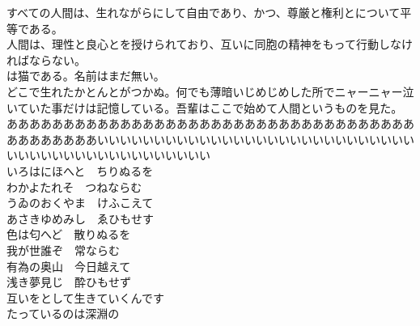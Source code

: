 \documentclass[a4paper]{minimal}
\begin{document}
	\setlength{\parindent}{0em}

	\setlength{\baselineskip}{1.5em}

	すべての人間は、生れながらにして自由であり、かつ、尊厳と権利とについて平等である。 \\
	人間は、理性と良心とを授けられており、互いに同胞の精神をもって行動しなければならない。 \\

	は猫である。名前はまだ無い。 \\
	どこで生れたかとんとがつかぬ。何でも薄暗いじめじめした所でニャーニャー泣いていた事だけは記憶している。吾輩はここで始めて人間というものを見た。 \\

	ああああああああああああああああああああああああああああああああああああああああああああいいいいいいいいいいいいいいいいいいいいいいいいいいいいいいいいいいいいいいいいいいいいいい \\

	いろはにほへと　ちりぬるを \\
	わかよたれそ　つねならむ \\
	うゐのおくやま　けふこえて \\
	あさきゆめみし　ゑひもせす \\

	色は匂へど　散りぬるを \\
	我が世誰ぞ　常ならむ \\
	有為の奥山　今日越えて \\
	浅き夢見じ　酔ひもせず \\

	互いをとして生きていくんです \\

	たっているのは深淵の \\
\end{document}
